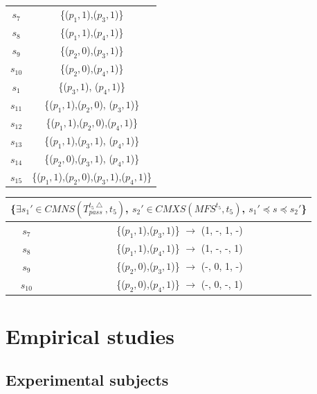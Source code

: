 {\begin{table}[htbp]
\begin{tabular}{|c|c|}
   $s_{7}$ & \{($p_{1}, 1$),($p_{3}, 1$)\} \\

   $s_{8}$ & \{($p_{1}, 1$),($p_{4}, 1$)\} \\

   $s_{9}$ & \{($p_{2}, 0$),($p_{3}, 1$)\} \\

   $s_{10}$ & \{($p_{2}, 0$),($p_{4}, 1$)\} \\

   $s_{1}$ & \{($p_{3}, 1$), ($p_{4}, 1$)\} \\

   $s_{11}$ & \{($p_{1}, 1$),($p_{2}, 0$), ($p_{3}, 1$)\} \\

   $s_{12}$ & \{($p_{1}, 1$),($p_{2}, 0$),($p_{4}, 1$)\} \\

   $s_{13}$ & \{($p_{1}, 1$),($p_{3}, 1$), ($p_{4}, 1$)\} \\

   $s_{14}$ & \{($p_{2}, 0$),($p_{3}, 1$), ($p_{4}, 1$)\} \\

   $s_{15}$ & \{($p_{1}, 1$),($p_{2}, 0$),($p_{3}, 1$),($p_{4}, 1$)\} \\

    \hline
    \end{tabular}%
   \quad
    \begin{tabular}{|c|c|} \hline
   \multicolumn{2}{|c|}{\{$\exists s_{1}' \in CMNS(T_{pass}^{t_{5}\bigtriangleup}, t_{5})$, $s_{2}' \in CMXS(MFS^{t_{5}}, t_{5})$, $s_{1}' \preceq s \preceq s_{2}'$\}}\\ \hline
   $s_{7}$ & \{($p_{1}, 1$),($p_{3}, 1$)\}  $\rightarrow$  (1, -, 1, -) \\
   $s_{8}$ & \{($p_{1}, 1$),($p_{4}, 1$)\}  $\rightarrow$  (1, -, -, 1) \\
   $s_{9}$ & \{($p_{2}, 0$),($p_{3}, 1$)\}  $\rightarrow$  (-, 0, 1, -) \\
   $s_{10}$ & \{($p_{2}, 0$),($p_{4}, 1$)\} $\rightarrow$  (-, 0, -, 1) \\
   \hline
    \end{tabular}%
\end{table}


\section{Empirical studies}\label{sec:emp}


\subsection{Experimental subjects}

}
